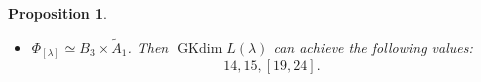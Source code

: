 \documentclass[reqno,12pt]{amsart}
\numberwithin{equation}{section}
\theoremstyle{plain}
\newtheorem{Prop}[Thm]{Proposition}
\theoremstyle{definition}
\newcommand{\lam}{\lambda}
\newcommand{\Ann}{\mathrm{Ann}}
\newcommand{\gkd}{\operatorname{GKdim}}
\begin{document}
\begin{Prop}
\begin{itemize}


    
    
    \item[(4)] $\Phi_{[\lam]}\simeq B_3\times \tilde{A}_1$. Then
$ \gkd L(\lam) $ can achieve the following values:
$$14, 15, [19,  24].$$




    


\end{itemize}
\end{Prop}
\end{document}
